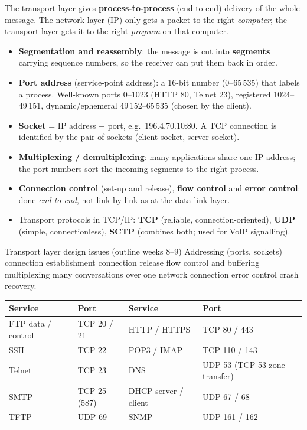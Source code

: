 \documentclass[10pt]{article}
\begin{document}
The transport layer gives \textbf{process-to-process} (end-to-end) delivery of the whole message.
The network layer (IP) only gets a packet to the right \emph{computer}; the transport layer gets it to the right \emph{program} on that computer.

\begin{itemize}
\item \textbf{Segmentation and reassembly}: the message is cut into \textbf{segments} carrying sequence numbers, so the receiver can put them back in order.
\item \textbf{Port address} (service-point address): a 16-bit number (0--65\,535) that labels a process. Well-known ports 0--1023 (HTTP 80, Telnet 23), registered 1024--49\,151, dynamic/ephemeral 49\,152--65\,535 (chosen by the client).
\item \textbf{Socket} = IP address + port, e.g.\ 196.4.70.10:80. A TCP connection is identified by the pair of sockets (client socket, server socket).
\item \textbf{Multiplexing / demultiplexing}: many applications share one IP address; the port numbers sort the incoming segments to the right process.
\item \textbf{Connection control} (set-up and release), \textbf{flow control} and \textbf{error control}: done \emph{end to end}, not link by link as at the data link layer.
\item Transport protocols in TCP/IP: \textbf{TCP} (reliable, connection-oriented), \textbf{UDP} (simple, connectionless), \textbf{SCTP} (combines both; used for VoIP signalling).
\end{itemize}

\begin{keydef}{Transport layer design issues (outline weeks 8--9)}
Addressing (ports, sockets) \textbullet{} connection establishment \textbullet{} connection release \textbullet{} flow control and buffering \textbullet{} multiplexing many conversations over one network connection \textbullet{} error control \textbullet{} crash recovery.
\end{keydef}

\begin{center}\small
\begin{tabular}{llll}
\toprule
\textbf{Service} & \textbf{Port} & \textbf{Service} & \textbf{Port}\\\midrule
FTP data / control & TCP 20 / 21 & HTTP / HTTPS & TCP 80 / 443\\
SSH & TCP 22 & POP3 / IMAP & TCP 110 / 143\\
Telnet & TCP 23 & DNS & UDP 53 (TCP 53 zone transfer)\\
SMTP & TCP 25 (587) & DHCP server / client & UDP 67 / 68\\
TFTP & UDP 69 & SNMP & UDP 161 / 162\\
\bottomrule
\end{tabular}
\end{center}
\end{document}

